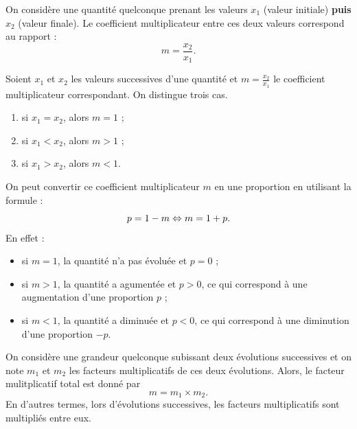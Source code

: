 \documentclass[a4paper, 12pt]{report}
\begin{document}
\begin{defn}
On considère une quantité quelconque prenant les valeurs $x_1$ (valeur initiale) \textbf{puis} $x_2$ (valeur finale).
Le coefficient multiplicateur entre ces deux valeurs correspond au rapport :
\[ m = \dfrac{x_2}{x_1} . \]
\end{defn}

\begin{prop}
Soient $x_1$ et $x_2$ les valeurs successives d'une quantité et $m = \frac{x_2}{x_1}$ le coefficient multiplicateur correspondant.
On distingue trois cas.
\begin{enumerate}
    \item si $x_1=x_2$, alors $m=1$ ;
    \item si $x_1 < x_2$, alors $m>1$ ; 
    \item si $x_1 > x_2$, alors $m<1$.
\end{enumerate}
\end{prop}

\begin{rmq}
On peut convertir ce coefficient multiplicateur $m$ en une proportion en utilisant la formule :
\[ p = 1 - m \Leftrightarrow m = 1 + p . \]
En effet :
\begin{itemize}
\item si $m=1$, la quantité n'a pas évoluée et $p = 0$ ;
\item si $m>1$, la quantité a agumentée et $p>0$, ce qui correspond à une augmentation d'une proportion $p$ ;
\item si $m<1$, la quantité a diminuée et $p<0$, ce qui correspond à une diminution d'une proportion $-p$.
\end{itemize}
\end{rmq}

\begin{thm}
On considère une grandeur quelconque subissant deux évolutions successives 
et on note $m_1$ et $m_2$ les facteurs multiplicatifs de ces deux évolutions.
Alors, le facteur mulitplicatif total est donné par 
\[ m=m_1 \times m_2 . \]
En d'autres termes, lors d'évolutions successives, les facteurs multiplicatifs sont multipliés entre eux. 

\begin{center}
\end{center}
\end{thm}
\end{document}
